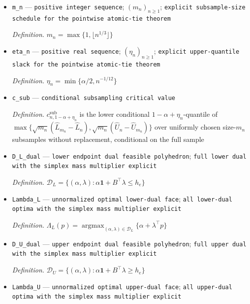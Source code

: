 \documentclass{article}
\begin{document}
\begin{itemize}
  \item \texttt{m\_\allowbreak{}n} --- \texttt{positive integer sequence}; \((m_n)_{n\ge1}\); \texttt{explicit subsample-\allowbreak{}size schedule for the pointwise atomic-\allowbreak{}tie theorem}
  \par\smallskip\noindent\emph{Definition.} \(m_n=\max\{1,\lfloor n^{1/3}\rfloor\}\)
  \item \texttt{eta\_\allowbreak{}n} --- \texttt{positive real sequence}; \((\eta_n)_{n\ge1}\); \texttt{explicit upper-\allowbreak{}quantile slack for the pointwise atomic-\allowbreak{}tie theorem}
  \par\smallskip\noindent\emph{Definition.} \(\eta_n=\min\{\alpha/2,n^{-1/12}\}\)
  \item \texttt{c\_\allowbreak{}sub} --- \texttt{conditional subsampling critical value}
  \par\smallskip\noindent\emph{Definition.} \(c^{\mathrm{sub}}_{n,1-\alpha+\eta_n}\) is the lower conditional \(1-\alpha+\eta_n\)-quantile of \(\max\{\sqrt{m_n}(\widehat L_{m_n}-\widehat L_n),\sqrt{m_n}(\widehat U_n-\widehat U_{m_n})\}\) over uniformly chosen size-\(m_n\) subsamples without replacement, conditional on the full sample
  \item \texttt{D\_\allowbreak{}L\_\allowbreak{}dual} --- \texttt{lower endpoint dual feasible polyhedron}; \texttt{full lower dual with the simplex mass multiplier explicit}
  \par\smallskip\noindent\emph{Definition.} \(\mathcal D_L=\{(\alpha,\lambda):\alpha\mathbf 1+B^{\top}\lambda\le h_e\}\)
  \item \texttt{Lambda\_\allowbreak{}L} --- \texttt{unnormalized optimal lower-\allowbreak{}dual face}; \texttt{all lower-\allowbreak{}dual optima with the simplex mass multiplier explicit}
  \par\smallskip\noindent\emph{Definition.} \(\Lambda_L(p)=\operatorname*{argmax}_{(\alpha,\lambda)\in\mathcal D_L}\{\alpha+\lambda^{\top}p\}\)
  \item \texttt{D\_\allowbreak{}U\_\allowbreak{}dual} --- \texttt{upper endpoint dual feasible polyhedron}; \texttt{full upper dual with the simplex mass multiplier explicit}
  \par\smallskip\noindent\emph{Definition.} \(\mathcal D_U=\{(\alpha,\lambda):\alpha\mathbf 1+B^{\top}\lambda\ge h_e\}\)
  \item \texttt{Lambda\_\allowbreak{}U} --- \texttt{unnormalized optimal upper-\allowbreak{}dual face}; \texttt{all upper-\allowbreak{}dual optima with the simplex mass multiplier explicit}

\end{itemize}
\end{document}
